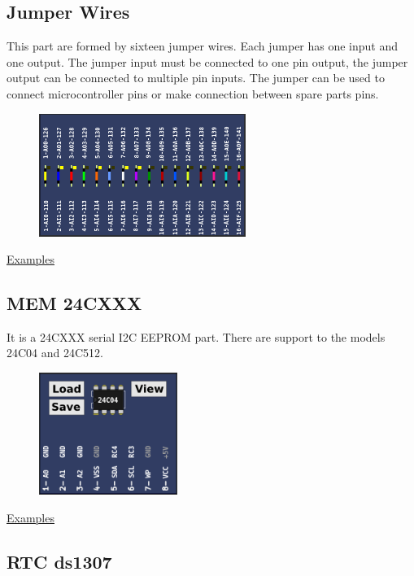 \subsection{Jumper Wires}

This part are formed by sixteen jumper wires. Each jumper has one input and one output.  The jumper input must be connected to one pin output, 
the jumper output can be connected to multiple pin inputs. The jumper can be used to connect microcontroller pins or make connection between 
spare parts pins.   

\begin{figure}[H]
\center
\includegraphics[width=0.6\textwidth]{img/part_jumper.png} 
\end{figure} 

\href{https://lcgamboa.github.io/picsimlab_examples/parts_Jumper_Wires.html}{Examples}

\subsection{MEM 24CXXX}

It is a 24CXXX serial I2C EEPROM part. There are support to the models 24C04 and 24C512.

\begin{figure}[H]
\center
\includegraphics[width=0.4\textwidth]{img/part_mem24xx.png} 
\end{figure}

\href{https://lcgamboa.github.io/picsimlab_examples/parts_MEM_24CXXX.html}{Examples}

\subsection{RTC ds1307}


